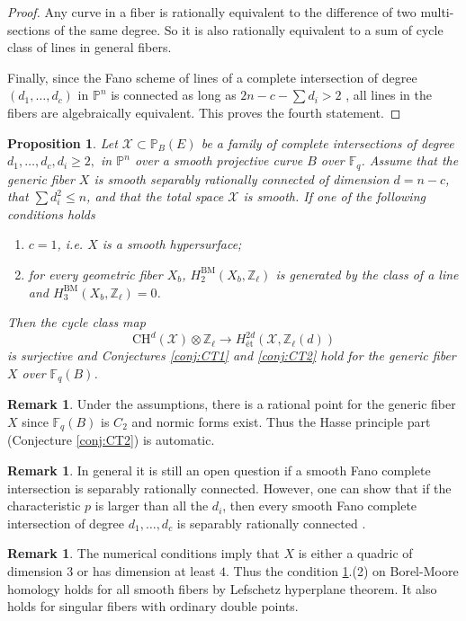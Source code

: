 \documentclass{amsart}
\newtheorem{prop}[theorem]{Proposition}
\theoremstyle{definition}
\newtheorem{rem}[theorem]{Remark}
\theoremstyle{remark}
\newcommand{\mbb}{\mathbb}
\newcommand{\FF}{\mbb{F}}
\newcommand{\ZZ}{\mbb{Z}}
\newcommand{\PP}{\mbb{P}}
\newcommand{\mc}{\mathcal}
\newcommand{\mcX}{\mc{X}}
\begin{document}
\begin{proof}
Any curve in a fiber is rationally equivalent to the difference of two multi-sections of the same degree.
So it is also rationally equivalent to a sum of cycle class of lines in general fibers.

Finally, since the Fano scheme of lines of a complete intersection of degree $(d_1, \ldots, d_c)$ in $\PP^n$ is connected as long as $2n-c-\sum d_i>2$ \cite[Th\'eor\`eme 2.1]{DebarreManivelFanoScheme}, all lines in the fibers are algebraically equivalent.
This proves the fourth statement.
\end{proof}

\begin{prop}\label{ci}
Let $\mcX \subset \PP_B(E)$ be a family of complete intersections of degree $d_1, \ldots, d_c, d_i \geq 2,$ in $\PP^n$ over a smooth projective curve $B$ over $\FF_q$. 
Assume that the generic fiber $X$ is smooth separably rationally connected of dimension $d=n-c$, that $\sum d_i^2\leq n$, and that the total space $\mcX$ is smooth.
If one of the following conditions holds
\begin{enumerate}
    
    \item $c=1$, i.e. $X$ is a smooth hypersurface;
    \item for every geometric fiber $X_b$, $H^\text{BM}_2(X_b, \ZZ_\ell)$ is generated by the class of a line and $H^\text{BM}_3(X_b, \ZZ_\ell)=0$.
\end{enumerate}
Then the cycle class map 
\[
\text{CH}^d(\mcX) \otimes \ZZ_\ell \to H^{2d}_{\text{{\'e}t}}(\mcX, \ZZ_\ell(d))
\]
is surjective and Conjectures \ref{conj:CT1} and \ref{conj:CT2} hold for the generic fiber $X$ over $\FF_q(B)$.
\end{prop}
\begin{rem}
    Under the assumptions, there is a rational point for the generic fiber $X$ since $\FF_q(B)$ is $C_2$ and normic forms exist. Thus the Hasse principle part (Conjecture \ref{conj:CT2}) is automatic.
\end{rem}

\begin{rem}
 In general it is still an open question if a smooth Fano complete intersection is separably rationally connected. However, one can show that if the characteristic $p$ is larger than all the $d_i$, then every smooth Fano complete intersection of degree $d_1, \ldots, d_c$ is separably rationally connected \cite{WASTZ2018}.
\end{rem}

\begin{rem}\label{rem:bm_condition}
The numerical conditions imply that $X$ is either a quadric of dimension $3$ or has dimension at least $4$.
Thus the condition \ref{ci}.(2) on Borel-Moore homology holds for all smooth fibers by Lefschetz hyperplane theorem.
It also holds for singular fibers with ordinary double points.
\end{rem}
\end{document}
